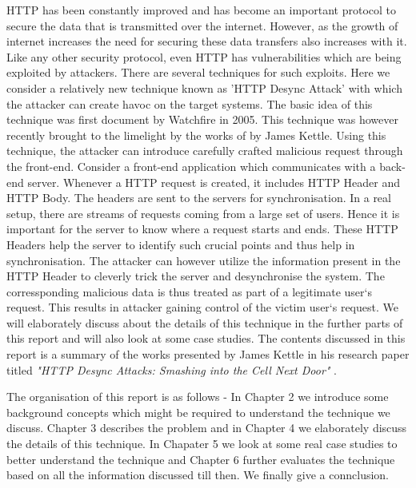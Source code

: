 HTTP has been constantly improved and has become an important protocol to secure the data that is transmitted over the internet. However, as the growth of internet increases the need for securing these data transfers also increases with it. Like any other security protocol, even HTTP has vulnerabilities which are being exploited by attackers. There are several techniques for such exploits. Here we consider a relatively new technique known as 'HTTP Desync Attack' with which the attacker can create havoc on the target systems. The basic idea of this technique was first document by Watchfire in 2005\cite{b5}. This technique was however recently brought to the limelight by the works of by James Kettle\cite{b6}. Using this technique, the attacker can introduce carefully crafted malicious request through the front-end. Consider a front-end application which communicates with a back-end server.  Whenever a HTTP request is created, it includes HTTP Header and HTTP Body. The headers are sent to the servers for synchronisation. In a real setup, there are streams of requests coming from a large set of users. Hence it is important for the server to know where a request starts and ends. These HTTP Headers help the server to identify such crucial points and thus help in synchronisation. The attacker can however utilize the information present in the HTTP Header to cleverly trick the server and desynchronise the system. The corressponding malicious data is thus treated as part of a legitimate user`s request. This results in attacker gaining control of the victim user`s request. We will elaborately discuss about the details of this technique in the further parts of this report and will also look at some case studies. The contents discussed in this report is a summary of the works presented by James Kettle in his research paper titled \textit{"HTTP Desync Attacks: Smashing into the Cell Next Door"} \cite{b6}.

The organisation of this report is as follows - In Chapter 2 we introduce some background concepts which might be required to understand the technique we discuss. Chapter 3 describes the problem and in Chapter 4 we elaborately discuss the details of this technique. In Chapater 5 we look at some real case studies to better understand the technique and Chapter 6 further evaluates the technique based on all the information discussed till then. We finally give a connclusion. 


